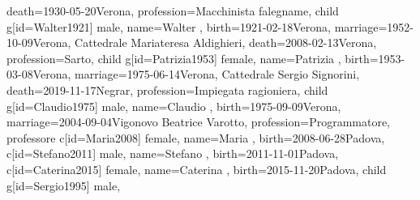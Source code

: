 \documentclass{article}
\begin{document}
\begin{midpage}
\begin{center}
\begin{genealogypicture}
{{{{{{                        death={1930-05-20}{Verona},
                        profession={Macchinista falegname},
                    }
                    child{
                        g[id=Walter1921]{
                            male,
                            name={Walter },
                            birth={1921-02-18}{Verona},
                            marriage={1952-10-09}{Verona, Cattedrale \newline Mariateresa Aldighieri},
                            death={2008-02-13}{Verona},
                            profession={Sarto},
                        }
                        child{
                            g[id=Patrizia1953]{
                                female,
                                name={Patrizia },
                                birth={1953-03-08}{Verona},
                                marriage={1975-06-14}{Verona, Cattedrale \newline Sergio Signorini},
                                death={2019-11-17}{Negrar},
                                profession={Impiegata ragioniera},
                            }
                            child{
                                g[id=Claudio1975]{
                                    male,
                                    name={Claudio },
                                    birth={1975-09-09}{Verona},
                                    marriage={2004-09-04}{Vigonovo \newline Beatrice Varotto},
                                    profession={Programmatore, professore}
                                }
                                c[id=Maria2008]{
                                    female,
                                    name={Maria },
                                    birth={2008-06-28}{Padova},
                                }
                                c[id=Stefano2011]{
                                    male,
                                    name={Stefano },
                                    birth={2011-11-01}{Padova},
                                }
                                c[id=Caterina2015]{
                                    female,
                                    name={Caterina },
                                    birth={2015-11-20}{Padova},
                                }
                            }
                        }
                        child{
                            g[id=Sergio1995]{
                                male,
}}}}}}}}
\end{genealogypicture}
\end{center}
\end{midpage}
\end{document}
